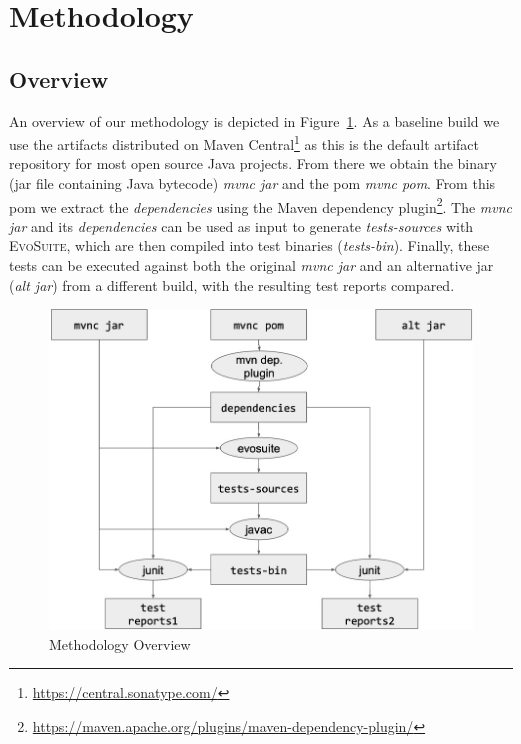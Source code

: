 \documentclass[conference]{IEEEtran}
\makeatletter
\newcommand{\evosuite}{\textsc{EvoSuite}\@\xspace}
\makeatother
\begin{document}
\section{Methodology}
\label{sec:methodology}


\subsection{Overview}

An overview of our methodology is depicted in Figure~\ref{fig:methodology}.  As a baseline build we use the artifacts distributed on Maven Central\footnote{\url{https://central.sonatype.com/}} as this is the default artifact repository for most open source Java projects.  From there we obtain the binary (jar file containing Java bytecode) \textit{mvnc jar} and the pom \textit{mvnc pom}. From this pom we extract the \textit{dependencies} using the Maven dependency plugin\footnote{\url{https://maven.apache.org/plugins/maven-dependency-plugin/}}. The \textit{mvnc jar} and its \textit{dependencies} can be used as input to generate \textit{tests-sources} with \evosuite, which are then compiled into test binaries (\textit{tests-bin}). Finally, these tests can be executed against both the original \textit{mvnc jar} and an alternative jar (\textit{alt jar}) from a different build, with the resulting test reports compared.

\begin{figure}[t!]
	\centering
	\includegraphics[width=\columnwidth]{methodology.jpg}
	\caption{Methodology Overview \label{fig:methodology}}
\end{figure}
\end{document}
